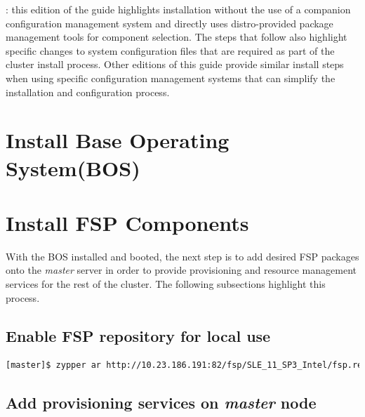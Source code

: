 \documentclass[letterpaper]{article}
\begin{document}
: this edition of the guide highlights
installation without the use of a companion configuration management system and
directly uses distro-provided package management tools for component
selection. The steps that follow also highlight specific changes to system
configuration files that are required as part of the cluster install
process. Other editions of this guide provide similar install steps when using
specific configuration management systems that can simplify the installation
and configuration process. \\





\section{Install Base Operating System(BOS)}



\section{Install FSP Components} \label{sec:basic_install}

With the BOS installed and booted, the next step is to add desired FSP packages
onto the {\em master} server in order to provide provisioning and resource
management services for the rest of the cluster. The following subsections
highlight this process.

\subsection{Enable FSP repository for local use}


\begin{lstlisting}[language=bash]
[master]$ zypper ar http://10.23.186.191:82/fsp/SLE_11_SP3_Intel/fsp.repo 
\end{lstlisting}


\subsection{Add provisioning services on {\em master} node}
\end{document}
